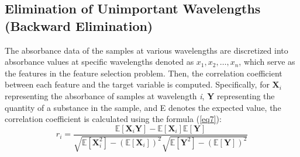 \documentclass[10pt, a4paper, oneside]{article}
\begin{document}
\subsection{Elimination of Unimportant Wavelengths (Backward Elimination)}

The absorbance data of the samples at various wavelengths are discretized into absorbance values at specific wavelengths denoted as {\(x_1,x_2,…,x_n\)}, which serve as the features in the feature selection problem. Then, the correlation coefficient between each feature and the target variable is computed. Specifically, for \(\textbf{X}_i\) representing the absorbance of samples at wavelength \textit{i}, \textbf{Y} representing the quantity of a substance in the sample, and E denotes the expected value, the correlation coefficient is calculated using the formula (\ref{eq7}):
\begin{equation} \label{eq7}
r_i = \frac{\mathbb{E}[\textbf{X}_i\textbf{Y}] - \mathbb{E}[\textbf{X}_i]\mathbb{E}[\textbf{Y}]}{\sqrt{\mathbb{E}[\textbf{X}_i^2] - (\mathbb{E}[\textbf{X}_i])^2}\sqrt{\mathbb{E}[\textbf{Y}^2] - (\mathbb{E}[\textbf{Y}])^2}}
\end{equation}
\end{document}
